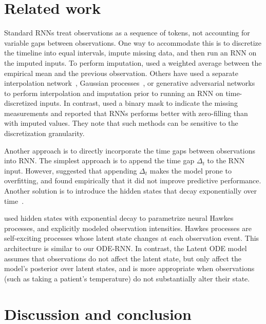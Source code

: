\documentclass{article}
\begin{document}
\section{Related work}

Standard RNNs treat observations as a sequence of tokens, not accounting for variable gaps between observations.
One way to accommodate this is to discretize the timeline into equal intervals, impute missing data, and then run an RNN on the imputed inputs.
To perform imputation, \citet{che_sontag_2018} used a weighted average between the empirical mean and the previous observation.
Others have used a separate interpolation network~\citep{shukla2018interpolationprediction}, Gaussian processes~\citep{pmlrv70futoma17a}, or generative adversarial networks~\citep{gan_imputation} to perform interpolation and imputation prior to running an RNN on time-discretized inputs.
In contrast, \citet{pmlr_Lipton16} used a binary mask to indicate the missing measurements and reported that RNNs performs better with zero-filling than with imputed values.
They note that such methods can be sensitive to the discretization granularity.

Another approach is to directly incorporate the time gaps between observations into RNN.
The simplest approach is to append the time gap $\Delta_t$ to the RNN input. 
However, \citet{mozer_2017} suggested that appending $\Delta_t$ makes the model prone to overfitting, and found empirically that it did not improve predictive performance.
Another solution is to introduce the hidden states that decay exponentially over time~\citep{che_sontag_2018, BRITS_2018, google_ehr_2018}.

\citet{neural_hawkes} used hidden states with exponential decay to parametrize neural Hawkes processes, and explicitly modeled observation intensities.
Hawkes processes are self-exciting processes whose latent state changes at each observation event.
This architecture is similar to our ODE-RNN.
In contrast, the Latent ODE model assumes that observations do not affect the latent state, but only affect the model's posterior over latent states, and is more appropriate when observations (such as taking a patient's temperature) do not substantially alter their state. 









\section{Discussion and conclusion}
\end{document}
